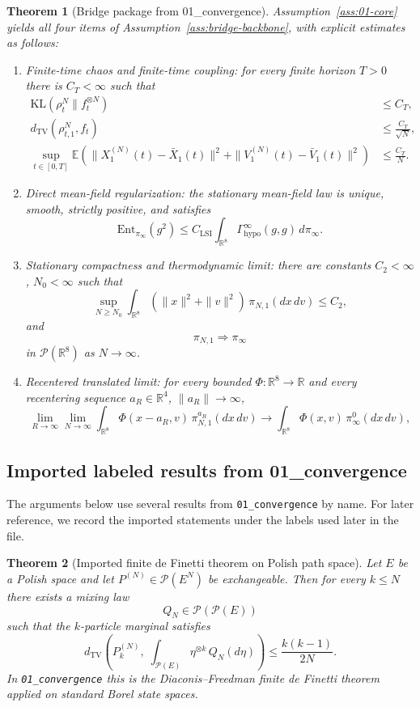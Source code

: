 \documentclass[11pt]{article}
\newtheorem{theorem}{Theorem}[section]
\theoremstyle{definition}
\theoremstyle{remark}
\newcommand{\R}{\mathbb R}
\newcommand{\E}{\mathbb E}
\newcommand{\KL}{\mathrm{KL}}
\newcommand{\Ent}{\mathrm{Ent}}
\newcommand{\TV}{\mathrm{TV}}
\newcommand{\mcP}{\mathcal P}
\begin{document}
\begin{theorem}[Bridge package from 01\_convergence]
\label{thm:bridge-from-01}
Assumption~\ref{ass:01-core} yields all four items of
Assumption~\ref{ass:bridge-backbone}, with explicit estimates as follows:
\begin{enumerate}[leftmargin=1.5em,label=\textnormal{(\roman*)}]
\item Finite-time chaos and finite-time coupling:
for every finite horizon $T>0$ there is $C_T<\infty$ such that
\begin{align*}
\KL(\rho_t^N\|f_t^{\otimes N})&\leq C_T,\\
d_{\TV}(\rho_{t,1}^N,f_t)&\leq \frac{C_T}{\sqrt N},\\
\sup_{t\in[0,T]}
\E\!\left(
\|X_1^{(N)}(t)-\bar X_1(t)\|^2
+\|V_1^{(N)}(t)-\bar V_1(t)\|^2
\right)
&\leq \frac{C_T}{N}.
\end{align*}
\item Direct mean-field regularization:
the stationary mean-field law is unique, smooth, strictly positive, and satisfies
\[
\Ent_{\pi_\infty}(g^2)
\le
C_{\mathrm{LSI}}\int_{\R^8}\Gamma_{\mathrm{hypo}}^\infty(g,g)\,d\pi_\infty.
\]
\item Stationary compactness and thermodynamic limit:
there are constants $C_2<\infty$, $N_0<\infty$ such that
\[
\sup_{N\ge N_0}\int_{\R^8}(\|x\|^2+\|v\|^2)\,\pi_{N,1}(dx\,dv)\le C_2,
\]
and
\[
\pi_{N,1}\Rightarrow\pi_\infty
\]
in $\mcP(\R^8)$ as $N\to\infty$.
\item Recentered translated limit:
for every bounded $\Phi:\R^8\to\R$ and every recentering sequence
$a_R\in\R^4$, $\|a_R\|\to\infty$,
\[
\lim_{R\to\infty}\lim_{N\to\infty}
\int_{\R^8}\Phi(x-a_R,v)\,\pi_{N,1}^{a_R}(dx\,dv)
\to
\int_{\R^8}\Phi(x,v)\,\pi_\infty^0(dx\,dv),
\]
\end{enumerate}

\end{theorem}

\subsection{Imported labeled results from 01\_convergence}

The arguments below use several results from \texttt{01\_convergence} by name.
For later reference, we record the imported statements under the labels used
later in the file.

\begin{theorem}[Imported finite de Finetti theorem on Polish path space]
\label{thm:definetti}
Let \(E\) be a Polish space and let \(P^{(N)}\in\mcP(E^N)\) be exchangeable.
Then for every \(k\le N\) there exists a mixing law
\[
Q_N\in\mcP(\mcP(E))
\]
such that the \(k\)-particle marginal satisfies
\[
d_{\TV}\!\left(
P^{(N)}_k,\;
\int_{\mcP(E)}\eta^{\otimes k}\,Q_N(d\eta)
\right)
\le
\frac{k(k-1)}{2N}.
\]
In \texttt{01\_convergence} this is the Diaconis--Freedman finite de Finetti
theorem applied on standard Borel state spaces.
\end{theorem}
\end{document}
